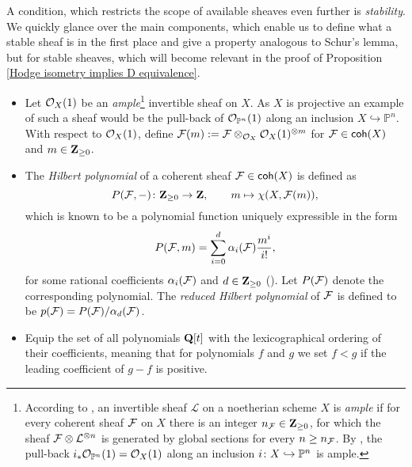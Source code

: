 A condition, which restricts the scope of available sheaves even further is \emph{stability}. We quickly glance over the main components, which enable us to define what a stable sheaf is in the first place and give a property analogous to Schur's lemma, but for stable sheaves, which will become relevant in the proof of Proposition \ref{Hodge isometry implies D equivalence}.
\begin{itemize}[label = $\vartriangleright$]
    \item{
        Let ${\mathcal{O}_{X}}(1)$ be an \emph{ample}\footnote{
            According to \cite[\S II.7]{Hartshorne1977}, an invertible sheaf $\mathcal L$ on a noetherian scheme $X$ is \emph{ample} if for every coherent sheaf $\mathcal F$ on $X$ there is an integer $n_\mathcal F \in \mathbf Z_{\geq 0}$, for which the sheaf $\mathcal F \otimes \mathcal L^{\otimes n}$ is generated by global sections for every $n \geq n_\mathcal F$. By \cite[\S II, Example 7.6.1]{Hartshorne1977}, the pull-back $i_*{\mathcal{O}_{\mathbb P^n}}(1) = {\mathcal{O}_{X}}(1)$ along an inclusion $i \colon X \hookrightarrow \mathbb P^n$ is ample. 
        } invertible sheaf on $X$. As $X$ is projective an example of such a sheaf would be the pull-back of ${\mathcal{O}_{\mathbb P^n}}(1)$ along an inclusion $X \hookrightarrow \mathbb{P}^n$. With respect to ${\mathcal{O}_{X}}(1)$, define 
        $\mathcal F(m) := \mathcal F \otimes_{{\mathcal{O}_{X}}} {\mathcal{O}_{X}}(1)^{\otimes m}$ for $\mathcal F \in \mathsf{coh}(X)$ and $m \in \mathbf Z_{\geq 0}$.
        }
    \item{
        The \emph{Hilbert polynomial} of a coherent sheaf $\mathcal F \in \mathsf{coh}(X)$ is defined as
        \[
            P(\mathcal F, -) \colon \mathbf Z_{\geq 0} \to \mathbf Z, \qquad m \mapsto \chi(X, \mathcal F(m)),
        \]
        which is known to be a polynomial function uniquely expressible in the form 
        \[
            P(\mathcal F, m) = \sum_{i = 0}^d \alpha_i(\mathcal F)\frac{m^i}{i!},
        \]
        for some rational coefficients $\alpha_i(\mathcal F)$ and $d \in \mathbf Z_{\geq 0}$ (\cf \cite[\S I.1.2, Lemma 1.2.1]{HuybrechtsLehn2010}). Let $P(\mathcal F)$ denote the corresponding polynomial. The \emph{reduced Hilbert polynomial} of $\mathcal F$ is defined to be $p(\mathcal F) = P(\mathcal F)/\alpha_d(\mathcal F)$. 
    }
    \item{
        Equip the set of all polynomials $\mathbf Q[t]$ with the lexicographical ordering of their coefficients, meaning that for polynomials $f$ and $g$ we set $f < g$ if the leading coefficient of $g - f$ is positive. 
}
\end{itemize}
